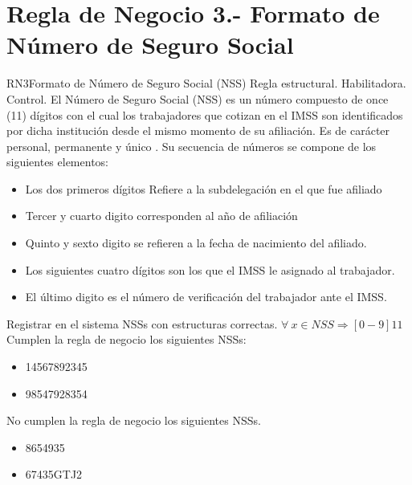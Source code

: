 \section{Regla de Negocio 3.- Formato de Número de Seguro Social }

\begin{BussinesRule}{RN3}{Formato de Número de Seguro Social (NSS)}
	\BRitem[Tipo:] Regla estructural. 
	\BRitem[Clase:] Habilitadora. 
	\BRitem[Nivel:] Control. %
	\BRitem[Descripción:]El Número de Seguro Social (NSS) es un número compuesto de once (11) dígitos con el cual los trabajadores que cotizan en el IMSS son identificados por dicha institución desde el mismo momento de su afiliación. Es de carácter personal, permanente y único \cite{NSS}. Su secuencia de números se compone de los siguientes elementos:
	        \begin{itemize}
	            \item Los dos primeros dígitos Refiere a la subdelegación en el que fue afiliado
	            \item Tercer y cuarto digito corresponden al año de afiliación
	            \item Quinto y sexto digito se refieren a la fecha de nacimiento del afiliado.
	            \item Los siguientes cuatro dígitos son los que el IMSS le asignado al trabajador.
	            \item El último digito es el número de verificación del trabajador ante el IMSS.
	           
	        \end{itemize}
	        
	
	\BRitem[Motivación:] Registrar en el sistema NSSs con estructuras correctas.
	\BRitem[Sentencia:] $\forall\ x \in NSS \Rightarrow     [0-9]{11}$
	 Cumplen la regla de negocio los siguientes NSSs:
        \begin{itemize}
			\item 14567892345
			\item 98547928354
        \end{itemize}
	 No cumplen la regla de negocio los siguientes NSSs.
		\begin{itemize}
        	\item 8654935
			\item 67435GTJ2
        	
    \end{itemize}
\end{BussinesRule}
